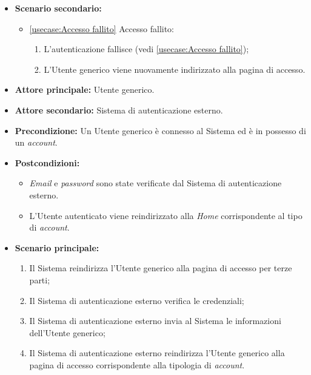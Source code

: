 \begin{itemize}
	\item \textbf{Scenario secondario:}
	\begin{itemize}
		\item \autoref{usecase:Accesso fallito} Accesso fallito:
		\begin{enumerate}
			\item L'autenticazione fallisce (vedi \autoref{usecase:Accesso fallito});
			\item L'Utente generico viene nuovamente indirizzato alla pagina di accesso.
		\end{enumerate}	
	\end{itemize}
\end{itemize}

\label{usecase:Accesso per terze parti}
\begin{itemize}

	\item \textbf{Attore principale:} Utente generico.
	\item \textbf{Attore secondario:} Sistema di autenticazione esterno.

	\item \textbf{Precondizione:} Un Utente generico è connesso al Sistema ed è in possesso di un \textit{account}.

	\item \textbf{Postcondizioni:} 
	\begin{itemize}
		\item \textit{Email} e \textit{password} sono state verificate dal Sistema di autenticazione esterno.
		\item L'Utente autenticato viene reindirizzato alla \textit{Home} corrispondente al tipo di \textit{account}.
	\end{itemize}

	\item \textbf{Scenario principale:}
	\begin{enumerate}
		\item Il Sistema reindirizza l'Utente generico alla pagina di accesso per terze parti;
		\item Il Sistema di autenticazione esterno verifica le credenziali;
		\item Il Sistema di autenticazione esterno invia al Sistema le informazioni dell'Utente generico;
		\item Il Sistema di autenticazione esterno reindirizza l'Utente generico alla pagina di accesso corrispondente alla tipologia di \textit{account}.		
	\end{enumerate}
	
\end{itemize}

